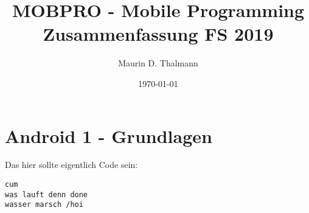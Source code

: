 \documentclass[a4paper]{article}
\title{\textbf{MOBPRO - Mobile Programming\\
Zusammenfassung FS 2019}}
\date{\today}
\author{Maurin D. Thalmann}
\begin{document}
	\maketitle
	\newpage
	\tableofcontents
	\newpage
	
	\section{Android 1 - Grundlagen}
	
	Das hier sollte eigentlich Code sein:
	
	\begin{lstlisting}
cum
was lauft denn done
wasser marsch /hoi
	\end{lstlisting}
	
	
	
	
	
	
\end{document}
